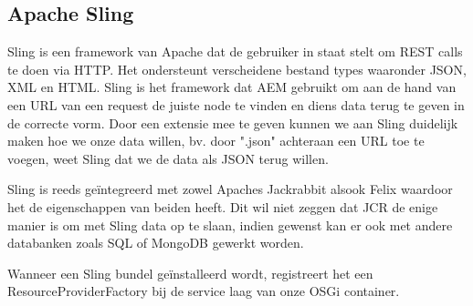 \documentclass{article}
\begin{document}
	\subsection{Apache Sling}
	Sling is een framework van Apache dat de gebruiker in staat stelt om REST calls te doen via HTTP. Het ondersteunt verscheidene bestand types waaronder JSON, XML en HTML. Sling is het framework dat AEM gebruikt om aan de hand van een URL van een request de juiste node te vinden en diens data terug te geven in de correcte vorm. Door een extensie mee te geven kunnen we aan Sling duidelijk maken hoe we onze data willen, bv. door ".json" achteraan een URL toe te voegen, weet Sling dat we de data als JSON terug willen.
	\par
	Sling is reeds ge\"integreerd met zowel Apaches Jackrabbit alsook Felix waardoor het de eigenschappen van beiden heeft. Dit wil niet zeggen dat JCR de enige manier is om met Sling data op te slaan, indien gewenst kan er ook met andere databanken zoals SQL of MongoDB gewerkt worden. 
	\par
	 Wanneer een Sling bundel ge\"installeerd wordt, registreert het een ResourceProviderFactory bij de service laag van onze OSGi container.  
\end{document}
